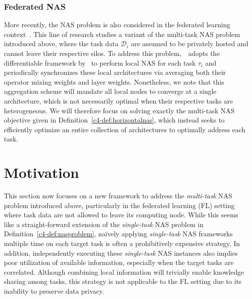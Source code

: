 \subsubsection{Federated NAS}
More recently, the NAS problem is also considered in the federated learning context~\cite{McMahan17}. This line of research  studies a variant of the multi-task NAS problem introduced above, where the task data $\mathcal{D}_i$ are assumed to be privately hosted and cannot leave their respective silos. To address this problem,~\citet{he2020fednas}~adopts the differentiable framework by~\citet{liu2018darts} to perform local NAS for each task $\tau_i$ and periodically synchronizes these local architectures via averaging both their operator mixing weights and layer weights. Nonetheless, we note that this aggregation scheme will mandate all local nodes to converge at a single architecture, which is not necessarily optimal when their respective tasks are heterogeneous. We will therefore focus on solving exactly the multi-task NAS objective given in Definition~\ref{c4-def:horizontalnas}, which instead seeks to efficiently optimize an entire collection of architectures to optimally address each task.

\section{Motivation}
This section now focuses on a new framework to address the \emph{multi-task} NAS problem introduced above, particularly in the federated learning (FL) setting~\cite{McMahan17} where task data are not allowed to leave its computing node. While this seems like a straight-forward extension of the \emph{single-task} NAS problem in Definition~\ref{c4-def:nasproblem}, na\"ively applying \emph{single-task} NAS frameworks multiple time on each target task is often a prohibitively expensive strategy. In addition, independently executing these \emph{single-task} NAS instances also implies poor utilization of available information, especially when the target tasks are correlated. Although combining local information will trivially enable knowledge sharing among tasks, this strategy is not applicable to the FL setting due to its inability to preserve data privacy.

